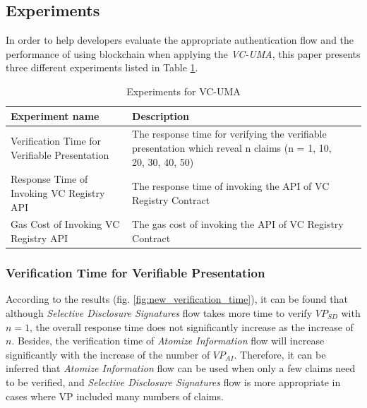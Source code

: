 \documentclass[conference, dvipdfmx]{IEEEtran} %
\begin{document}
\begin{sloppypar}
\subsection{Experiments}

In order to help developers evaluate the appropriate authentication flow and the performance of using blockchain when applying the \textit{VC-UMA}, this paper presents three different experiments listed in Table \ref{table:experiments_list}.

\begin{table}[htbp]
  \begin{center}
  \caption{Experiments for VC-UMA}
  \label{table:experiments_list}
  \begin{tabular}{p{3cm} p{5cm}l}
  \hline
  Experiment name	& Description \\ \hline\hline
  Verification Time for Verifiable Presentation	& The response time for verifying the verifiable presentation which reveal n claims (n = 1, 10, 20, 30, 40, 50) \\ \hline
  Response Time of Invoking VC Registry API & The response time of invoking the API of VC Registry Contract\\ \hline
  Gas Cost of Invoking VC Registry API	& The gas cost of invoking the API of VC Registry Contract\\ \hline
  \end{tabular}
  \end{center}

\end{table}

\subsubsection{Verification Time for Verifiable Presentation}
According to the results (fig. \ref{fig:new_verification_time}), it can be found that although \textit{Selective Disclosure Signatures} flow takes more time to verify $VP_{SD}$ with $n = 1$, the overall response time does not significantly increase as the increase of $n$. Besides, the verification time of \textit{Atomize Information} flow will increase significantly with the increase of the number of $VP_{AI}$. Therefore, it can be inferred that \textit{Atomize Information} flow can be used when only a few claims need to be verified, and \textit{Selective Disclosure Signatures} flow is more appropriate in cases where VP included many numbers of claims.


\end{sloppypar}
\end{document}
